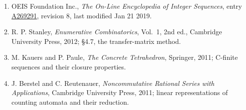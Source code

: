 \documentclass[11pt]{article}
\theoremstyle{definition}
\begin{document}
\begin{enumerate}

\item OEIS Foundation Inc., \emph{The On-Line Encyclopedia of Integer Sequences}, entry \href{https://oeis.org/A269291}{A269291}, revision 8, last modified Jan 21 2019.

\item R. P. Stanley, \emph{Enumerative Combinatorics}, Vol.~1, 2nd ed., Cambridge University Press, 2012; \S4.7, the transfer-matrix method.

\item M. Kauers and P. Paule, \emph{The Concrete Tetrahedron}, Springer, 2011; C-finite sequences and their closure properties.

\item J. Berstel and C. Reutenauer, \emph{Noncommutative Rational Series with Applications}, Cambridge University Press, 2011; linear representations of counting automata and their reduction.

\end{enumerate}
\end{document}
